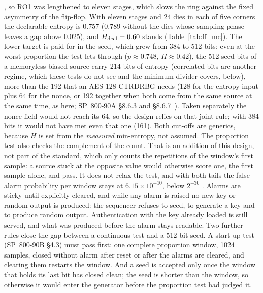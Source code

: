 \simu{}, so RO1 was lengthened to eleven stages, which slows the ring
against the fixed asymmetry of the flip-flop. With eleven stages and 24
dies in each of five corners the declarable entropy is 0.757 \simu{}
(0.789 without the dies whose sampling phase leaves a gap above 0.025),
and $H_{\mathrm{decl}} = 0.60$ stands (Table~\ref{tab:ff_mc}). The lower target is
paid for in the seed, which grew from 384 to 512 bits: even at the worst
proportion the test lets through ($p \approx 0.748$, $H \approx 0.42$),
the 512 seed bits of a memoryless biased source carry 214 bits of
entropy (correlated bits are another regime, which these tests do not
see and the minimum divider covers, below), more than the 192 that an
AES-128 \ac{CTRDRBG} needs (128 for the entropy input plus 64 for the
nonce, or 192 together when both come from the same source at the same
time, as here; SP~800-90A \S8.6.3 and
\S8.6.7~\cite{barker_2015_sp80090ar1}). Taken separately the nonce field
would not reach its 64, so the design relies on that joint rule; with
384 bits it would not have met even that one (161). Both
cut-offs are generics,
because $H$ is set from the \emph{measured} min-entropy, not assumed. The
proportion test
also checks the complement of the count. That is an addition of this
design, not part of the standard, which only counts the repetitions of
the window's first sample: a source stuck at the opposite value would
otherwise score one, the first sample alone, and pass. It does not relax
the test, and with both tails the false-alarm probability per window
stays at $6.15\times10^{-10}$, below $2^{-30}$ \est{}. Alarms are sticky
until explicitly cleared, and while any alarm is raised no new key or
random output is produced: the sequencer refuses to seed, to generate a
key and to produce random output. Authentication with the key already
loaded is still served, and what was produced before the alarm stays
readable. Two further rules close the gap between a continuous test
and a 512-bit seed. A start-up test (SP~800-90B \S4.3) must pass first:
one complete proportion window, 1024 samples, closed without alarm after
reset or after the alarms are cleared, and clearing them restarts the
window. And a seed is accepted only once the window that holds its last
bit has closed clean; the seed is shorter than the window, so otherwise
it would enter the generator before the proportion test had judged it.

